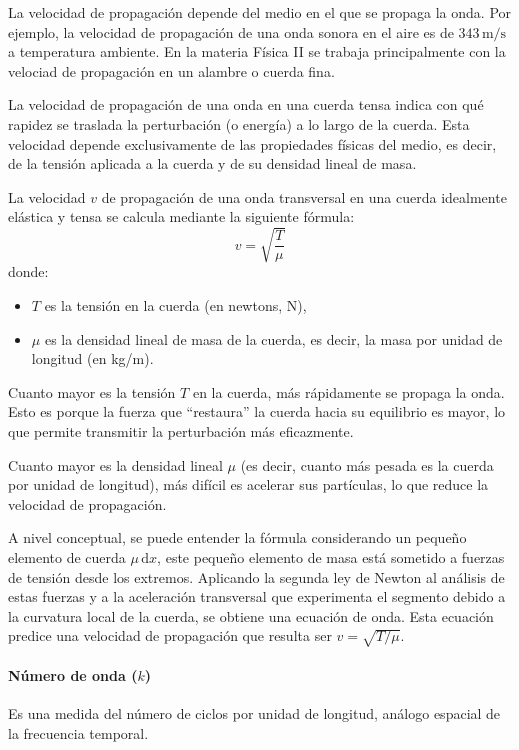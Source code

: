 La velocidad de propagación depende del medio en el que se propaga la onda. Por ejemplo, la velocidad de propagación de una onda sonora en el aire es de \(343\, \text{m/s}\) a temperatura ambiente. En la materia Física II se trabaja principalmente con la velociad de propagación en un alambre o cuerda fina. 

La velocidad de propagación de una onda en una cuerda tensa indica con qué rapidez se traslada la perturbación (o energía) a lo largo de la cuerda. Esta velocidad depende exclusivamente de las propiedades físicas del medio, es decir, de la tensión aplicada a la cuerda y de su densidad lineal de masa.

La velocidad \(v\) de propagación de una onda transversal en una cuerda idealmente elástica y tensa se calcula mediante la siguiente fórmula:
\[
v = \sqrt{\frac{T}{\mu}}
\]
donde:
\begin{itemize}
  \item \(T\) es la tensión en la cuerda (en newtons, N),
  \item \(\mu\) es la densidad lineal de masa de la cuerda, es decir, la masa por unidad de longitud (en kg/m).
\end{itemize}

Cuanto mayor es la tensión \(T\) en la cuerda, más rápidamente se propaga la onda. Esto es porque la fuerza que ``restaura'' la cuerda hacia su equilibrio es mayor, lo que permite transmitir la perturbación más eficazmente.

Cuanto mayor es la densidad lineal \(\mu\) (es decir, cuanto más pesada es la cuerda por unidad de longitud), más difícil es acelerar sus partículas, lo que reduce la velocidad de propagación.

A nivel conceptual, se puede entender la fórmula considerando un pequeño elemento de cuerda \(\mu \, \mathrm{d}x\), este pequeño elemento de masa está sometido a fuerzas de tensión desde los extremos. Aplicando la segunda ley de Newton al análisis de estas fuerzas y a la aceleración transversal que experimenta el segmento debido a la curvatura local de la cuerda, se obtiene una ecuación de onda. Esta ecuación predice una velocidad de propagación que resulta ser \(v = \sqrt{T / \mu}\).

\paragraph{Número de onda (\(k\))}

Es una medida del número de ciclos por unidad de longitud, análogo espacial de la frecuencia temporal.

